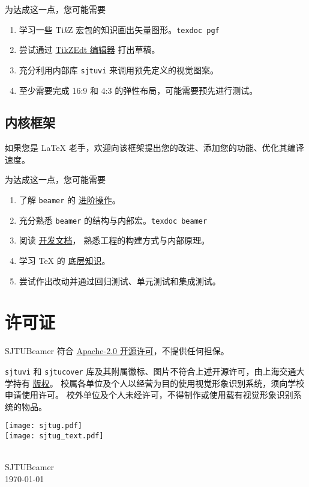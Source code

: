\documentclass[
    UTF8,
    heading=true,
    12pt,
    a4paper
]{ctexrep}
\def\themename{\textsf{SJTUBeamer}}
\def\sjtuglogo{
  \parbox{4cm}{
    \centering
    \texttt{[image: sjtug.pdf]}\\
    \vspace*{5pt}
    \texttt{[image: sjtug\_text.pdf]}
  }
}
\begin{document}
为达成这一点，您可能需要
\begin{enumerate}
  \item 学习一些 Ti\textit{k}Z
        宏包的知识画出矢量图形。\texttt{texdoc pgf}
  \item 尝试通过
        \href{https://code.google.com/archive/p/tikzedt/downloads}{TikZEdt 编辑器} 打出草稿。
  \item 充分利用内部库 \texttt{sjtuvi} 来调用预先定义的视觉图案。
  \item 至少需要完成 16:9 和 4:3 的弹性布局，可能需要预先进行测试。
\end{enumerate}

\section{内核框架}

如果您是 \LaTeX{} 老手，欢迎向该框架提出您的改进、添加您的功能、优化其编译速度。

为达成这一点，您可能需要
\begin{enumerate}
  \item 了解 \texttt{beamer}
        的 \href{https://latex-beamer.com/}{进阶操作}。
  \item 充分熟悉 \texttt{beamer}
        的结构与内部宏。\texttt{texdoc beamer}
  \item 阅读
        \href{run:sjtubeamerdevguide.pdf}{开发文档}，
        熟悉工程的构建方式与内部原理。
  \item 学习 \TeX{} 的
        \href{https://mirrors.sjtug.sjtu.edu.cn/CTAN/graphics/pgf/contrib/pgfplots/doc/TeX-programming-notes.pdf}{底层知识}。
  \item 尝试作出改动并通过回归测试、单元测试和集成测试。
\end{enumerate}

\chapter*{许可证}

\themename{} 符合
\href{https://github.com/sjtug/SJTUBeamer/blob/main/LICENSE}{Apache-2.0 开源许可}，不提供任何担保。

\texttt{sjtuvi} 和 \texttt{sjtucover}
库及其附属徽标、图片不符合上述开源许可，由上海交通大学持有
\href{https://vi.sjtu.edu.cn/index.php/articles/bulletin/16}{版权}。
校属各单位及个人以经营为目的使用视觉形象识别系统，须向学校申请使用许可。
校外单位及个人未经许可，不得制作或使用载有视觉形象识别系统的物品。

\vfill
{
\centering
\sjtuglogo\\
{\large \themename{}\\}
\today\\
}
\vfill
\end{document}
